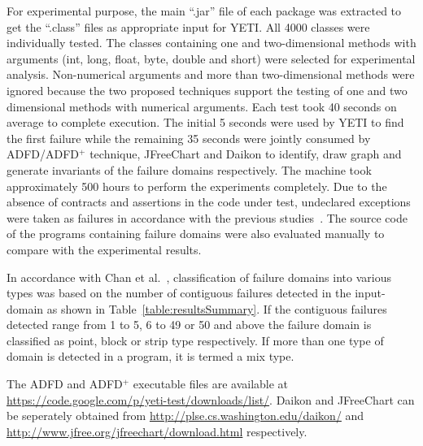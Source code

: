 For experimental purpose, the main ``.jar'' file of each package was extracted to get the ``.class'' files as appropriate input for YETI. All 4000 classes were individually tested. The classes containing one and two-dimensional methods with arguments (int, long, float, byte, double and short) were selected for experimental analysis. Non-numerical arguments and more than two-dimensional methods were ignored because the two proposed techniques support the testing of one and two dimensional methods with numerical arguments. Each test took 40 seconds on average to complete execution. The initial 5 seconds were used by YETI to find the first failure while the remaining 35 seconds were jointly consumed by ADFD/ADFD$^+$ technique, JFreeChart and Daikon to identify, draw graph and generate invariants of the failure domains respectively. The machine took approximately 500 hours to perform the experiments completely. Due to the absence of contracts and assertions in the code under test, undeclared exceptions were taken as failures in accordance with the previous studies~\cite{oriol2012random, ahmad2013adfd}. The source code of the programs containing failure domains were also evaluated manually to compare with the experimental results. 

In accordance with  Chan et al.~\cite{chan1996proportional}, classification of failure domains into various types was based on the number of contiguous failures detected in the input-domain as shown in Table~\ref{table:resultsSummary}. If the contiguous failures detected range from 1 to 5, 6 to 49 or 50 and above the failure domain is classified as point, block or strip type respectively. If more than one type of domain is detected in a program, it is termed a mix type. 

The ADFD and ADFD$^+$ executable files are available at \url{https://code.google.com/p/yeti-test/downloads/list/}. Daikon and JFreeChart can be seperately obtained from \url{http://plse.cs.washington.edu/daikon/} and \url{http://www.jfree.org/jfreechart/download.html} respectively. 

\bigskip

